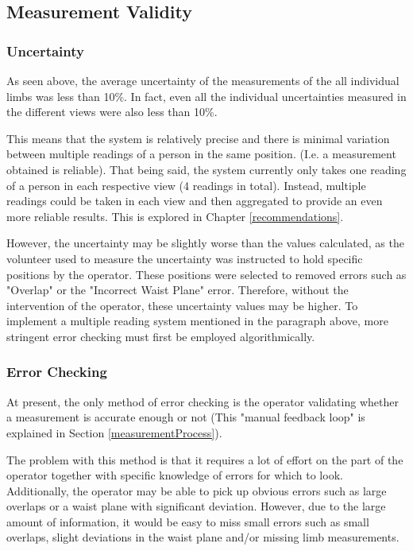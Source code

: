\subsection{Measurement Validity}

\subsubsection{Uncertainty}
As seen above, the average uncertainty of the measurements of the all individual limbs was less than 10\%. In fact, even all the individual uncertainties measured in the different views were also less than 10\%. 

This means that the system is relatively precise and there is minimal variation between multiple readings of a person in the same position. (I.e. a measurement obtained is reliable). That being said, the system currently only takes one reading of a person in each respective view (4 readings in total). Instead, multiple readings could be taken in each view and then aggregated to provide an even more reliable results. This is explored in Chapter \ref{recommendations}. 

However, the uncertainty may be slightly worse than the values calculated, as the volunteer used to measure the uncertainty was instructed to hold specific positions by the operator. These positions were selected to removed errors such as "Overlap" or the "Incorrect Waist Plane" error. Therefore, without the intervention of the operator, these uncertainty values may be higher. To implement a multiple reading system mentioned in the paragraph above, more stringent error checking must first be employed algorithmically. 

\subsubsection{Error Checking} 
At present, the only method of error checking is the operator validating whether a measurement is accurate enough or not (This "manual feedback loop" is explained in Section \ref{measurementProcess}). 

The problem with this method is that it requires a lot of effort on the part of the operator together with specific knowledge of errors for which to look. Additionally, the operator may be able to pick up obvious errors such as large overlaps or a waist plane with significant deviation. However, due to the large amount of information, it would be easy to miss small errors such as small overlaps, slight deviations in the waist plane and/or missing limb measurements. 

